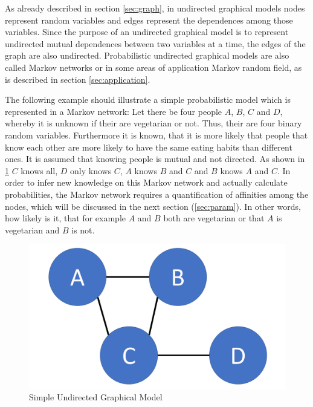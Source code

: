 \cite{hammersley1971markov}
\cite{pearl2014probabilistic}

As already described in section \ref{sec:graph}, in undirected graphical models nodes represent random variables and edges represent the dependences among those variables. Since the purpose of an undirected graphical model is to represent undirected mutual dependences between two variables at a time, the edges of the graph are also undirected. Probabilistic undirected graphical models are also called Markov networks or in some areas of application Markov random field, as is described in section \ref{sec:application}.

The following example should illustrate a simple probabilistic model which is represented in a Markov network: Let there be four people $A$, $B$, $C$ and $D$, whereby it is unknown if their are vegetarian or not. Thus, their are four binary random variables. Furthermore it is known, that it is more likely that people that know each other are more likely to have the same eating habits than different ones. It is assumed that knowing people is mutual and not directed. As shown in \ref{fig:basic} $C$ knows all, $D$ only knows $C$, $A$ knows $B$ and $C$ and $B$ knows $A$ and $C$. In order to infer new knowledge on this Markov network and actually calculate probabilities, the Markov network requires a quantification of affinities among the nodes, which will be discussed in the next section (\ref{sec:param}). In other words, how likely is it, that for example $A$ and $B$ both are vegetarian or that $A$ is vegetarian and $B$ is not.

\begin{figure}[htpb]
  \centering
  	\includegraphics[scale=0.3]{img/basic.pdf} 
  \caption{Simple Undirected Graphical Model}
  \label{fig:basic}
\end{figure}

